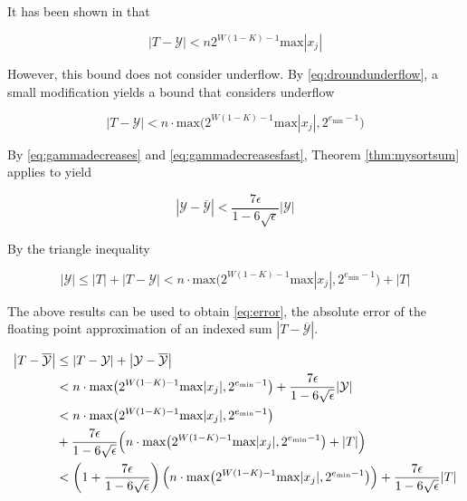 \documentclass[12pt]{article}
\providecommand{\min}{\ensuremath{\text{min}}}
\providecommand{\max}{\ensuremath{\text{max}}}
\theoremstyle{definition}
\numberwithin{equation}{section}
\numberwithin{figure}{section}
\begin{document}
    It has been shown in \cite{repsum} that

    \begin{equation}
      \label{eq:repboundnaive}
      |T - \mathcal{Y}| < n  2^{W  (1 - K) - 1}\max|x_j|
    \end{equation}

    However, this bound does not consider underflow. By  \eqref{eq:droundunderflow}, a small modification yields a bound that considers underflow

    \begin{equation}
      \label{eq:repbound}
      |T - \mathcal{Y}| < n \cdot \max\bigl(2^{W  (1 - K) - 1} \max|x_j|, 2^{e_{\min} - 1}\bigr)
    \end{equation}

    By  \eqref{eq:gammadecreases} and \eqref{eq:gammadecreasesfast}, Theorem \ref{thm:mysortsum} applies to yield

    \begin{equation*}
      \left|\mathcal{Y} - \overline{\mathcal{Y}}\right| < \frac{7\epsilon}{1 - 6\sqrt\epsilon}|\mathcal{Y}|
    \end{equation*}

    By the triangle inequality

    \begin{equation*}
      |\mathcal{Y}| \leq |T| + |T - \mathcal{Y}| < n \cdot \max\bigl(2^{W  (1 - K) - 1}  \max|x_j|, 2^{e_{\min} - 1}\bigr) + |T|
    \end{equation*}

    The above results can be used to obtain  \eqref{eq:error}, the absolute error of the floating point approximation of an indexed sum $|T - \overline{\mathcal{Y}}|$.

    \begin{align}
      \left|T - \overline{\mathcal{Y}}\right| &\leq |T - \mathcal{Y}| + \left|\mathcal{Y} - \overline{\mathcal{Y}}\right| \nonumber \\
      &< n \cdot \max\bigl(2^{W  (1 - K) - 1}  \max|x_j|, 2^{e_{\min} - 1}\bigr) + \frac{7\epsilon}{1 - 6\sqrt\epsilon} |\mathcal{Y}| \nonumber \\
      &< n \cdot \max\bigl(2^{W  (1 - K) - 1}  \max|x_j|, 2^{e_{\min} - 1}\bigr) \nonumber \\
      &+ \frac{7\epsilon}{1 - 6\sqrt\epsilon} \Bigl(n \cdot \max\bigl(2^{W  (1 - K) - 1}  \max|x_j|, 2^{e_{\min} - 1}\bigr) + |T|\Bigr) \nonumber \\
      &< \left(1 + \frac{7\epsilon}{1 - 6\sqrt\epsilon}\right) \Bigl(n \cdot \max\bigl(2^{W (1 - K) - 1} \max|x_j|, 2^{e_{\min} - 1}\bigr)\Bigr) + \frac{7\epsilon}{1 - 6\sqrt\epsilon} |T|
      \label{eq:error}
    \end{align}
\end{document}
